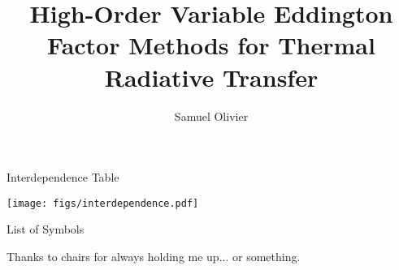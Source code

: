 \documentclass[todo]{dissertation}
\begin{document}
\title{High-Order Variable Eddington Factor Methods for Thermal Radiative Transfer}
\author{Samuel Olivier}
\maketitle

\copyrightpage



\begin{frontmatter}

\begin{KeepFromToc}
\tableofcontents
\end{KeepFromToc}
\clearpage

\begin{preamble}{Interdependence Table}
\vfill
\begin{center}
\label{preamble:interdependence}
\texttt{[image: figs/interdependence.pdf]}
\end{center}
\end{preamble}

\printglossary[style=april_gloss_style]
\clearpage

\begin{preamble}{List of Symbols}

\end{preamble}


\begin{preamble}{\acknowledgename}
Thanks to chairs for always holding me up... or something. 
\end{preamble}
\end{frontmatter}

\glsresetall %
\pagestyle{headings}










\glsresetall %

\clearpage
\printbibliography
\appendix 

\end{document}
